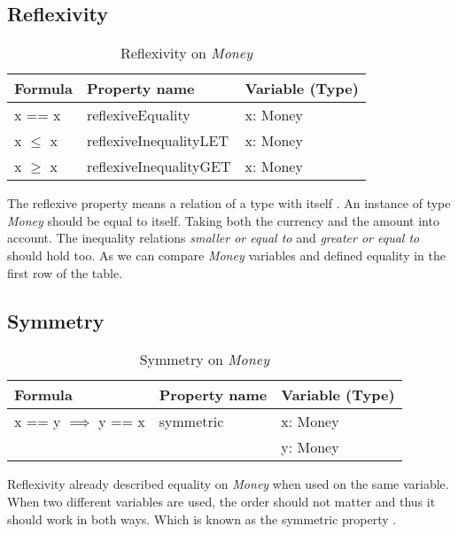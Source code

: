 \subsection*{Reflexivity}
\begin{table}[h!]
\centering
\begin{tabular}{|lll|}
\hline
                        \textbf{Formula} & \textbf{Property name} & \textbf{Variable (Type)} \\ \hline
\rowcolor[HTML]{EFEFEF} x == x           & reflexiveEquality      & x: Money                 \\
                        x $\leq$ x       & reflexiveInequalityLET & x: Money                 \\
\rowcolor[HTML]{EFEFEF} x $\geq$ x       & reflexiveInequalityGET & x: Money                 \\ \hline
\end{tabular}
\caption{Reflexivity on \textit{Money}}
\label{tbl:ch4_money_reflexivity}
\end{table}
The reflexive property means a relation of a type with itself \cite{raftery2011perspective}. An instance of type \textit{Money} should be equal to itself. Taking both the currency and the amount into account. The inequality relations \textit{smaller or equal to} and \textit{greater or equal to} should hold too. As we can compare \textit{Money} variables and defined equality in the first row of the table.

\subsection*{Symmetry}
\begin{table}[h!]
\centering
\begin{tabular}{|lll|}
\hline
                        \textbf{Formula}         & \textbf{Property name} & \textbf{Variable (Type)} \\ \hline
\rowcolor[HTML]{EFEFEF} x == y $\implies$ y == x & symmetric              & x: Money                 \\
\rowcolor[HTML]{EFEFEF}                          &                        & y: Money                 \\ \hline
\end{tabular}
\caption{Symmetry on \textit{Money}}
\label{tbl:ch4_money_symmetry}
\end{table}
Reflexivity already described equality on \textit{Money} when used on the same variable. When two different variables are used, the order should not matter and thus it should work in both ways. Which is known as the symmetric property \cite{raftery2011perspective}.

